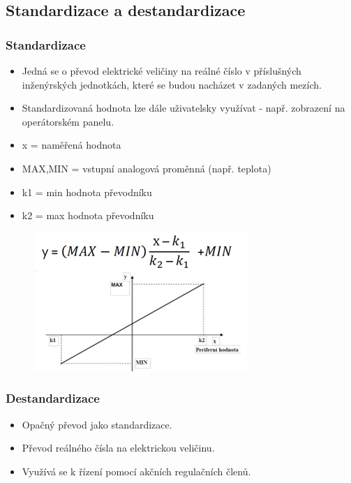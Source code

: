 \subsection{Standardizace a destandardizace}
\subsubsection*{Standardizace}
\begin{itemize}
    \item Jedná se o převod elektrické veličiny na reálné číslo v příslušných inženýrských jednotkách, které se budou nacházet v zadaných mezích.
    \item Standardizovaná hodnota lze dále uživatelsky využívat - např. zobrazení na operátorském panelu.
    \item x = naměřená hodnota
    \item MAX,MIN = vstupní analogová proměnná (např. teplota)
    \item k1 = min hodnota převodníku
    \item k2 = max hodnota převodníku
\end{itemize}

\begin{figure}[h]
    \begin{center}
        \includegraphics[scale = 1]{img/picture6.png}
    \end{center}
\end{figure}

\subsubsection*{Destandardizace}
\begin{itemize}
    \item Opačný převod jako standardizace.
    \item Převod reálného čísla na elektrickou veličinu.
    \item Využívá se k řízení pomocí akčních regulačních členů.
\end{itemize}

